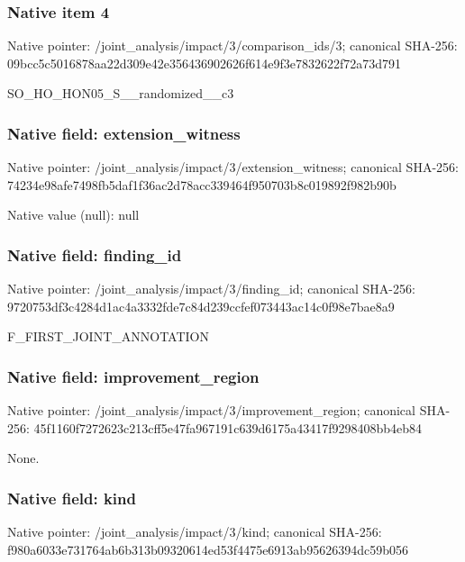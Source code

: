 \documentclass[10pt,a4paper]{article}
\begin{document}
\subsubsection{Native item 4}
Native pointer: /joint\_\allowbreak{}analysis/impact/3/comparison\_\allowbreak{}ids/3; canonical SHA-256: 09bcc5c5016878aa22d309e42e356436902626f614e9f3e7832622f72a73d791

\begingroup\raggedright\sloppy SO\_\allowbreak{}HO\_\allowbreak{}HON05\_\allowbreak{}S\_\allowbreak{}\_\allowbreak{}randomized\_\allowbreak{}\_\allowbreak{}c3\par\endgroup

\subsubsection{Native field: extension\_\allowbreak{}witness}
Native pointer: /joint\_\allowbreak{}analysis/impact/3/extension\_\allowbreak{}witness; canonical SHA-256: 74234e98afe7498fb5daf1f36ac2d78acc339464f950703b8c019892f982b90b

Native value (null): null

\subsubsection{Native field: finding\_\allowbreak{}id}
Native pointer: /joint\_\allowbreak{}analysis/impact/3/finding\_\allowbreak{}id; canonical SHA-256: 9720753df3c4284d1ac4a3332fde7c84d239ccfef073443ac14c0f98e7bae8a9

\begingroup\raggedright\sloppy F\_\allowbreak{}FIRST\_\allowbreak{}JOINT\_\allowbreak{}ANNOTATION\par\endgroup

\subsubsection{Native field: improvement\_\allowbreak{}region}
Native pointer: /joint\_\allowbreak{}analysis/impact/3/improvement\_\allowbreak{}region; canonical SHA-256: 45f1160f7272623c213cff5e47fa967191c639d6175a43417f9298408bb4eb84

\begingroup\raggedright\sloppy None.\par\endgroup

\subsubsection{Native field: kind}
Native pointer: /joint\_\allowbreak{}analysis/impact/3/kind; canonical SHA-256: f980a6033e731764ab6b313b09320614ed53f4475e6913ab95626394dc59b056
\end{document}
